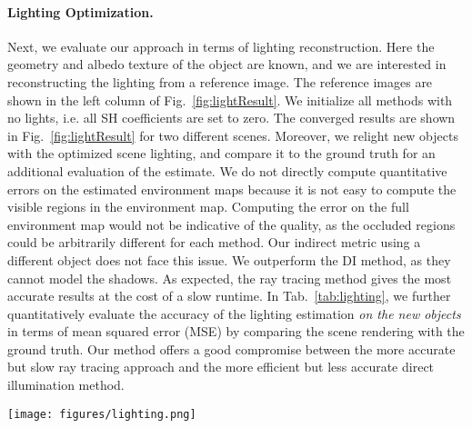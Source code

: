 \paragraph{Lighting Optimization.}
%
Next, we evaluate our approach in terms of lighting reconstruction.
%
Here the geometry and albedo texture of the object are known, and we are interested in reconstructing the lighting from a reference image.
%
The reference images are shown in the left column of Fig.~\ref{fig:lightResult}.
%
We initialize all methods with no lights, i.e. all SH coefficients are set to zero.
%
The converged results are shown in Fig.~\ref{fig:lightResult} for two different scenes.
%
Moreover, we relight new objects with the optimized scene lighting, and compare it to the ground truth for an additional evaluation of the estimate.
%
We do not directly compute quantitative errors on the estimated environment maps because it is not easy to compute the visible regions in the environment map. 
%
Computing the error on the full environment map would not be indicative of the quality, as the occluded regions could be arbitrarily different for each method. 
%
Our indirect metric using a different object does not face this issue.
%
We outperform the DI method, as they cannot model the shadows.
%
As expected, the ray tracing method gives the most accurate results at the cost of a slow runtime.
%
In Tab.~\ref{tab:lighting}, we further quantitatively evaluate the accuracy of the lighting estimation \textit{on the new objects} in terms of mean squared error (MSE) by comparing the scene rendering with the ground truth.
%
Our method offers a good compromise between the more accurate but slow ray tracing approach and the more efficient but less accurate direct illumination method.
%
%
\begin{figure*}
	\texttt{[image: figures/lighting.png]} 
	\caption
	{
		Lighting optimization results. 
		From left to right. 
		The reference image used to optimize the scene lighting.
	    The rendered scene with the optimized scene lighting.
        The ground truth image for a new object.
        The rendering of the new object using the previously optimized scene lighting.
	    Note that our approach gives a good compromise between runtime and accuracy, compared to other approaches.
	}
	\label{fig:lightResult}
\end{figure*}
%
%
%
